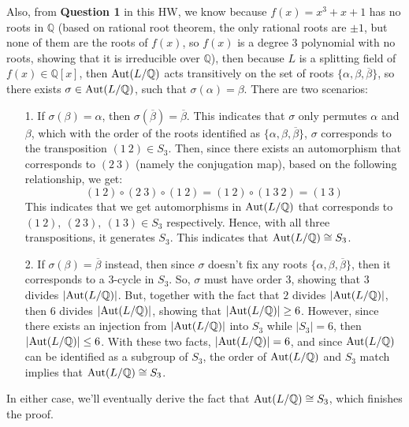 \documentclass{article}
\begin{document}
Also, from \textbf{Question 1} in this HW, we know because $f(x)=x^3+x+1$ has no roots in $\mathbb{Q}$ (based on rational root theorem, the only rational roots are $\pm 1$, but none of them are the roots of $f(x)$, so $f(x)$ is a degree 3 polynomial with no roots, showing that it is irreducible over $\mathbb{Q}$), then because $L$ is a splitting field of $f(x)\in \mathbb{Q}[x]$, then $\textmd{Aut}(L/\mathbb{Q})$ acts transitively on the set of roots $\{\alpha,\beta,\overline{\beta}\}$, so there exists $\sigma\in\textmd{Aut}(L/\mathbb{Q})$, such that $\sigma(\alpha)=\beta$. There are two scenarios:
\begin{itemize}
    \item[1.] If $\sigma(\beta)=\alpha$, then $\sigma(\overline{\beta})=\overline{\beta}$. This indicates that $\sigma$ only permutes $\alpha$ and $\beta$, which with the order of the roots identified as $\{\alpha,\beta,\overline{\beta}\}$, $\sigma$ corresponds to the transposition $(1\ 2)\in S_3$. Then, since there exists an automorphism that corresponds to $(2\ 3)$ (namely the conjugation map), based on the following relationship, we get:
    $$(1\ 2)\circ (2\ 3)\circ (1\ 2) = (1\ 2)\circ (1\ 3\ 2)= (1\ 3)$$
    This indicates that we get automorphisms in $\textmd{Aut}(L/\mathbb{Q})$ that corresponds to $(1\ 2),\ (2\ 3),\ (1\ 3)\in S_3$ respectively. Hence, with all three transpositions, it generates $S_3$. This indicates that $\textmd{Aut}(L/\mathbb{Q})\cong S_3$.

    \item[2.] If $\sigma(\beta)=\overline{\beta}$ instead, then since $\sigma$ doesn't fix any roots $\{\alpha,\beta,\overline{\beta}\}$, then it corresponds to a $3$-cycle in $S_3$. So, $\sigma$ must have order $3$, showing that $3$ divides $|\textmd{Aut}(L/\mathbb{Q})|$. But, together with the fact that $2$ divides $|\textmd{Aut}(L/\mathbb{Q})|$, then $6$ divides $|\textmd{Aut}(L/\mathbb{Q})|$, showing that $|\textmd{Aut}(L/\mathbb{Q})|\geq 6$. However, since there exists an injection from $|\textmd{Aut}(L/\mathbb{Q})|$ into $S_3$ while $|S_3|=6$, then $|\textmd{Aut}(L/\mathbb{Q})|\leq 6$. With these two facts, $|\textmd{Aut}(L/\mathbb{Q})|=6$, and since $\textmd{Aut}(L/\mathbb{Q})$ can be identified as a subgroup of $S_3$, the order of $\textmd{Aut}(L/\mathbb{Q})$ and $S_3$ match implies that $\textmd{Aut}(L/\mathbb{Q})\cong S_3$.
\end{itemize}
In either case, we'll eventually derive the fact that $\textmd{Aut}(L/\mathbb{Q})\cong S_3$, which finishes the proof.
\end{document}
